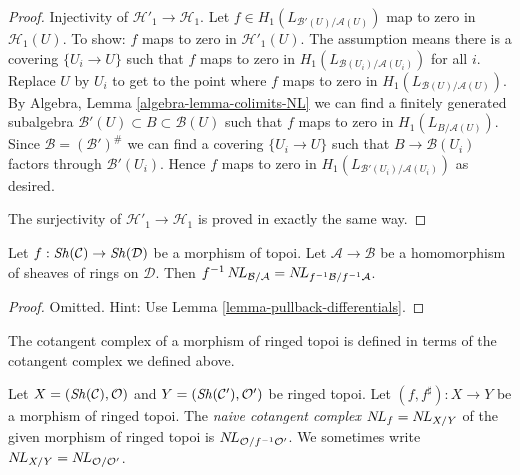 \begin{proof}
\medskip\noindent
Injectivity of $\mathcal{H}'_1 \to \mathcal{H}_1$. Let
$f \in H_1(L_{\mathcal{B}'(U)/\mathcal{A}(U)})$ map to zero
in $\mathcal{H}_1(U)$. To show: $f$ maps to zero in
$\mathcal{H}'_1(U)$. The assumption means there is a covering
$\{U_i \to U\}$ such that $f$ maps to zero in
$H_1(L_{\mathcal{B}(U_i)/\mathcal{A}(U_i)})$ for all $i$.
Replace $U$ by $U_i$ to get to the point where $f$ maps to zero
in $H_1(L_{\mathcal{B}(U)/\mathcal{A}(U)})$.
By Algebra, Lemma \ref{algebra-lemma-colimits-NL}
we can find a finitely generated subalgebra
$\mathcal{B}'(U) \subset B \subset \mathcal{B}(U)$ such
that $f$ maps to zero in $H_1(L_{B/\mathcal{A}(U)})$.
Since $\mathcal{B} = (\mathcal{B}')^\#$ we can find a covering
$\{U_i \to U\}$ such that $B \to \mathcal{B}(U_i)$ factors
through $\mathcal{B}'(U_i)$. Hence $f$ maps to zero in
$H_1(L_{\mathcal{B}'(U_i)/\mathcal{A}(U_i)})$ as desired.

\medskip\noindent
The surjectivity of $\mathcal{H}'_1 \to \mathcal{H}_1$ is proved
in exactly the same way.
\end{proof}

\begin{lemma}
\label{lemma-pullback-NL}
Let $f : \mathop{\mathit{Sh}}\nolimits(\mathcal{C}) \to \mathop{\mathit{Sh}}\nolimits(\mathcal{D})$ be a morphism of topoi.
Let $\mathcal{A} \to \mathcal{B}$ be a homomorphism of sheaves of rings
on $\mathcal{D}$. Then $f^{-1}\mathop{N\!L}\nolimits_{\mathcal{B}/\mathcal{A}} =
\mathop{N\!L}\nolimits_{f^{-1}\mathcal{B}/f^{-1}\mathcal{A}}$.
\end{lemma}

\begin{proof}
Omitted. Hint: Use Lemma \ref{lemma-pullback-differentials}.
\end{proof}

\noindent
The cotangent complex of a morphism of ringed topoi is defined
in terms of the cotangent complex we defined above.

\begin{definition}
\label{definition-cotangent-complex-morphism-ringed-topoi}
Let $X = (\mathop{\mathit{Sh}}\nolimits(\mathcal{C}), \mathcal{O})$ and
$Y = (\mathop{\mathit{Sh}}\nolimits(\mathcal{C}'), \mathcal{O}')$ be ringed topoi.
Let $(f, f^\sharp) : X \to Y$ be a morphism of ringed topoi.
The {\it naive cotangent complex} $\mathop{N\!L}\nolimits_f = \mathop{N\!L}\nolimits_{X/Y}$
of the given morphism of ringed topoi is
$\mathop{N\!L}\nolimits_{\mathcal{O}/f^{-1}\mathcal{O}'}$.
We sometimes write $\mathop{N\!L}\nolimits_{X/Y} = \mathop{N\!L}\nolimits_{\mathcal{O}/\mathcal{O}'}$.
\end{definition}









